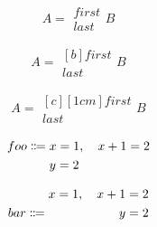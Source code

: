 \documentclass{article}
\begin{document}
\[
A = \begin{multlined}
\boxed{first} \\
\boxed{last}
\end{multlined} B
\]

\[
A = \begin{multlined}[b]
\boxed{first} \\
\boxed{last}
\end{multlined} B
\]

\[
A = \begin{multlined}[c][1cm]
\boxed{first} \\
\boxed{last}
\end{multlined} B
\]

\begin{equation}
foo\Coloneqq\begin{lgathered}[t]
x=1,\quad x+1=2 \\
y=2
\end{lgathered}
\end{equation}

\begin{equation}
bar\Coloneqq\begin{rgathered}[b]
x=1,\quad x+1=2 \\
y=2
\end{rgathered}
\end{equation}
\end{document}
